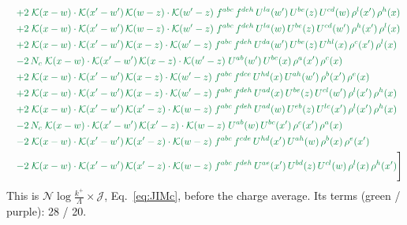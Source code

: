 \documentclass[10pt]{article}
\numberwithin{equation}{section}
\begin{document}
\begin{align}
&\quad{\color{JIM}+2\;\mathcal{K}(x-w)\cdot\mathcal{K}(x'-w')\,\mathcal{K}(w-z)\cdot\mathcal{K}(w'-z)\;f^{abc}\,f^{deh}\,U^{la}(w')\,U^{be}(z)\,U^{cd}(w)\,\rho^{l}(x')\,\rho^{h}(x)}\notag\\
&\quad{\color{JIM}+2\;\mathcal{K}(x-w)\cdot\mathcal{K}(x'-w')\,\mathcal{K}(w-z)\cdot\mathcal{K}(w'-z)\;f^{abc}\,f^{deh}\,U^{la}(w)\,U^{be}(z)\,U^{cd}(w')\,\rho^{h}(x')\,\rho^{l}(x)}\notag\\
&\quad{\color{JIM}+2\;\mathcal{K}(x-w)\cdot\mathcal{K}(x'-w')\,\mathcal{K}(x-z)\cdot\mathcal{K}(w'-z)\;f^{abc}\,f^{deh}\,U^{da}(w')\,U^{be}(z)\,U^{hl}(x)\,\rho^{c}(x')\,\rho^{l}(x)}\notag\\
&\quad{\color{JIM}-2\,N_c\;\mathcal{K}(x-w)\cdot\mathcal{K}(x'-w')\,\mathcal{K}(x-z)\cdot\mathcal{K}(w'-z)\;U^{ab}(w')\,U^{bc}(x)\,\rho^{a}(x')\,\rho^{c}(x)}\notag\\
&\quad{\color{JIM}+2\;\mathcal{K}(x-w)\cdot\mathcal{K}(x'-w')\,\mathcal{K}(x-z)\cdot\mathcal{K}(w'-z)\;f^{abc}\,f^{dce}\,U^{hd}(x)\,U^{ah}(w')\,\rho^{b}(x')\,\rho^{e}(x)}\notag\\
&\quad{\color{JIM}+2\;\mathcal{K}(x-w)\cdot\mathcal{K}(x'-w')\,\mathcal{K}(x-z)\cdot\mathcal{K}(w'-z)\;f^{abc}\,f^{deh}\,U^{ad}(x)\,U^{be}(z)\,U^{cl}(w')\,\rho^{l}(x')\,\rho^{h}(x)}\notag\\
&\quad{\color{JIM}+2\;\mathcal{K}(x-w)\cdot\mathcal{K}(x'-w')\,\mathcal{K}(x'-z)\cdot\mathcal{K}(w-z)\;f^{abc}\,f^{deh}\,U^{ad}(w)\,U^{eb}(z)\,U^{lc}(x')\,\rho^{l}(x')\,\rho^{h}(x)}\notag\\
&\quad{\color{JIM}-2\,N_c\;\mathcal{K}(x-w)\cdot\mathcal{K}(x'-w')\,\mathcal{K}(x'-z)\cdot\mathcal{K}(w-z)\;U^{ab}(w)\,U^{bc}(x')\,\rho^{c}(x')\,\rho^{a}(x)}\notag\\
&\quad{\color{JIM}-2\;\mathcal{K}(x-w)\cdot\mathcal{K}(x'-w')\,\mathcal{K}(x'-z)\cdot\mathcal{K}(w-z)\;f^{abc}\,f^{cde}\,U^{hd}(x')\,U^{ah}(w)\,\rho^{b}(x)\,\rho^{e}(x')}\notag\\
&\quad{\color{JIM}-2\;\mathcal{K}(x-w)\cdot\mathcal{K}(x'-w')\,\mathcal{K}(x'-z)\cdot\mathcal{K}(w-z)\;f^{abc}\,f^{deh}\,U^{ae}(x')\,U^{bd}(z)\,U^{cl}(w)\,\rho^{l}(x)\,\rho^{h}(x')}\Bigg]\label{eq:Jsum}
\end{align}
This is $\mathcal N\log\frac{k^+}{\Lambda}\times\mathcal J$, Eq.~\eqref{eq:JIMc}, before the charge average. Its terms (green / purple): 28 / 20.

\end{document}
